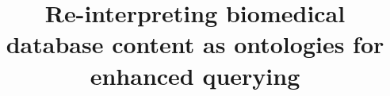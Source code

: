 \documentclass{bmcart}
\begin{document}
\begin{frontmatter}

\begin{fmbox}


\title{Re-interpreting biomedical database content as ontologies for enhanced querying}


\author[
   addressref={aff1},                   %
   noteref={n1},                        %
   email={fss3@cin.ufpe.br}   %
]{ }

\author[
addressref={aff2},                   %
noteref={n1},                        %
email={robert.hoehndorf@kaust.edu.sa}   %
]{ }

\author[
addressref={aff1},                   %
corref={aff1},                       %
noteref={n1},                        %
email={fred@cin.ufpe.br}   %
]{ }

\author[
addressref={aff3},                   %
noteref={n1},                        %
email={stefan.schulz@medunigraz.at}   %
]{ }



\end{fmbox}
\end{frontmatter}
\end{document}
